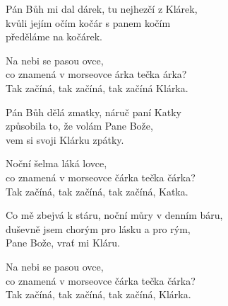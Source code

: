 
\ve{}
Pán Bůh mi dal dárek, tu nejhezčí z Klárek,\\
kvůli jejím očím kočár s panem kočím\\
předěláme na kočárek.

\cho{}
Na nebi se pasou ovce,\\
co znamená v morseovce árka tečka árka?\\
Tak začíná, tak začíná, tak začíná Klárka.

\ve{}
Pán Bůh dělá zmatky, náruč paní Katky\\
způsobila to, že volám Pane Bože,\\
vem si svoji Klárku zpátky.

\cho{}
Noční šelma láká lovce,\\
co znamená v morseovce čárka tečka čárka?\\
Tak začíná, tak začíná, tak začíná, Katka.

\ve{}
Co mě zbejvá k stáru, noční můry v denním báru,\\
duševně jsem chorým pro lásku a pro rým,\\
Pane Bože, vrať mi Kláru.

\cho{}
Na nebi se pasou ovce,\\
co znamená v morseovce čárka tečka čárka?\\
Tak začíná, tak začíná, tak začíná, Klárka. 

\esong